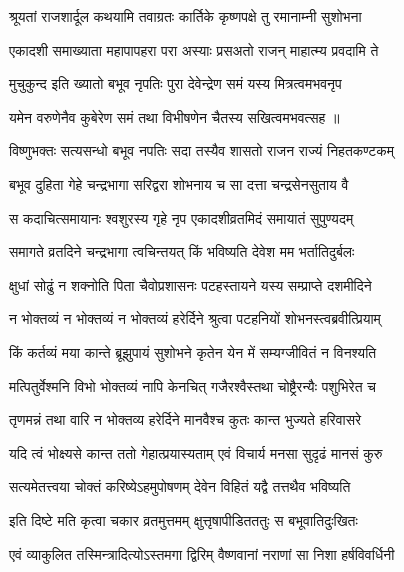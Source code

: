 
\twolineshloka
{श्रूयतां राजशार्दूल कथयामि तवाग्रतः}
{कार्तिके कृष्णपक्षे तु रमानाम्नी सुशोभना} %

\twolineshloka
{एकादशी समाख्याता महापापहरा परा}
{अस्याः प्रसअतो राजन् माहात्म्य प्रवदामि ते} %

\twolineshloka
{मुचुकुन्द इति ख्यातो बभूव नृपतिः पुरा}
{देवेन्द्रेण समं यस्य मित्रत्वमभवनृप} %

\twolineshloka
{यमेन वरुणेनैव कुबेरेण समं तथा}
{विभीषणेन चैतस्य सखित्वमभवत्सह} %
॥

\twolineshloka
{विष्णुभक्तः सत्यसन्धो बभूव नपतिः सदा}
{तस्यैव शासतो राजन राज्यं निहतकण्टकम्} %

\twolineshloka
{बभूव दुहिता गेहे चन्द्रभागा सरिद्वरा}
{शोभनाय च सा दत्ता चन्द्रसेनसुताय वै} %

\twolineshloka
{स कदाचित्समायानः श्वशुरस्य गृहे नृप}
{एकादशीव्रतमिदं समायातं सुपुण्यदम्} %

\twolineshloka
{समागते व्रतदिने चन्द्रभागा त्वचिन्तयत्}
{किं भविष्यति देवेश मम भर्तातिदुर्बलः} %

\twolineshloka
{क्षुधां सोढुं न शक्नोति पिता चैवोप्रशासनः}
{पटहस्तायने यस्य सम्प्राप्ते दशमीदिने} %

\twolineshloka
{न भोक्तव्यं न भोक्तव्यं न भोक्तव्यं हरेर्दिने}
{श्रुत्वा पटहनियों शोभनस्त्वब्रवीत्प्रियाम्} %

\twolineshloka
{किं कर्तव्यं मया कान्ते ब्रूझुपायं सुशोभने}
{कृतेन येन में सम्यग्जीवितं न विनश्यति} %


\twolineshloka
{मत्पितुर्वेश्मनि विभो भोक्तव्यं नापि केनचित्}
{गजैरश्वैस्तथा चोष्ट्रैरन्यैः पशुभिरेत च} %

\twolineshloka
{तृणमन्नं तथा वारि न भोक्तव्य हरेर्दिने}
{मानवैश्च कुतः कान्त भुज्यते हरिवासरे} %

\twolineshloka
{यदि त्वं भोक्ष्यसे कान्त ततो गेहात्प्रयास्यताम्}
{एवं विचार्य मनसा सुदृढं मानसं कुरु} %


\twolineshloka
{सत्यमेतत्त्वया चोक्तं करिष्येऽहमुपोषणम्}
{देवेन विहितं यद्वै तत्तथैव भविष्यति} %

\twolineshloka
{इति दिष्टे मति कृत्वा चकार व्रतमुत्तमम्}
{क्षुत्तृषापीडितततुः स बभूवातिदुःखितः} %

\twolineshloka
{एवं व्याकुलित तस्मिन्त्रादित्योऽस्तमगा द्विरिम्}
{वैष्णवानां नराणां सा निशा हर्षविवर्धिनी} %


